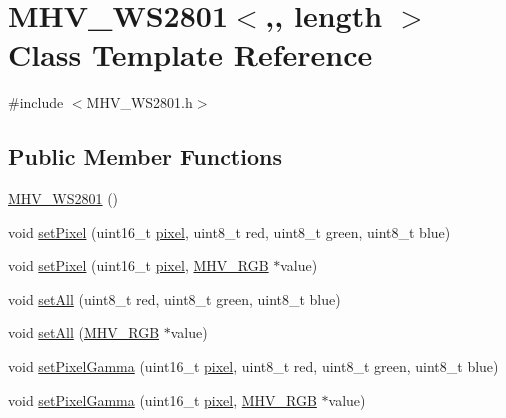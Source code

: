 \hypertarget{class_m_h_v___w_s2801}{\section{M\-H\-V\-\_\-\-W\-S2801$<$,, length $>$ Class Template Reference}
\label{class_m_h_v___w_s2801}
}


{\ttfamily \#include $<$M\-H\-V\-\_\-\-W\-S2801.\-h$>$}

\subsection*{Public Member Functions}
\begin{DoxyCompactItemize}
\item 
\hyperlink{class_m_h_v___w_s2801_a1afc461cca16546e8823b6d105663fb1}{M\-H\-V\-\_\-\-W\-S2801} ()
\item 
void \hyperlink{class_m_h_v___w_s2801_a57e45ceda44a511f3a1bd41d630f2b72}{set\-Pixel} (uint16\-\_\-t \hyperlink{_m_h_v___display___monochrome___buffered_8h_a9d20fe94f93b6c220969bb9050dfe1dc}{pixel}, uint8\-\_\-t red, uint8\-\_\-t green, uint8\-\_\-t blue)
\item 
void \hyperlink{class_m_h_v___w_s2801_a73e8df20791ce9b29de429d862f672a6}{set\-Pixel} (uint16\-\_\-t \hyperlink{_m_h_v___display___monochrome___buffered_8h_a9d20fe94f93b6c220969bb9050dfe1dc}{pixel}, \hyperlink{_m_h_v___r_g_b_8h_a17bc0cb27c702aac95873e5aab2ead87}{M\-H\-V\-\_\-\-R\-G\-B} $\ast$value)
\item 
void \hyperlink{class_m_h_v___w_s2801_ab18d73567be6985ed41e708b13c8682e}{set\-All} (uint8\-\_\-t red, uint8\-\_\-t green, uint8\-\_\-t blue)
\item 
void \hyperlink{class_m_h_v___w_s2801_a655462cf6e1e951e7d40744e3f646ec7}{set\-All} (\hyperlink{_m_h_v___r_g_b_8h_a17bc0cb27c702aac95873e5aab2ead87}{M\-H\-V\-\_\-\-R\-G\-B} $\ast$value)
\item 
void \hyperlink{class_m_h_v___w_s2801_a53ad7d9c6a9b7d9ddc457619e6601c52}{set\-Pixel\-Gamma} (uint16\-\_\-t \hyperlink{_m_h_v___display___monochrome___buffered_8h_a9d20fe94f93b6c220969bb9050dfe1dc}{pixel}, uint8\-\_\-t red, uint8\-\_\-t green, uint8\-\_\-t blue)
\item 
void \hyperlink{class_m_h_v___w_s2801_aac8d74d995c3d7465d7249865c259892}{set\-Pixel\-Gamma} (uint16\-\_\-t \hyperlink{_m_h_v___display___monochrome___buffered_8h_a9d20fe94f93b6c220969bb9050dfe1dc}{pixel}, \hyperlink{_m_h_v___r_g_b_8h_a17bc0cb27c702aac95873e5aab2ead87}{M\-H\-V\-\_\-\-R\-G\-B} $\ast$value)

\end{DoxyCompactItemize}
